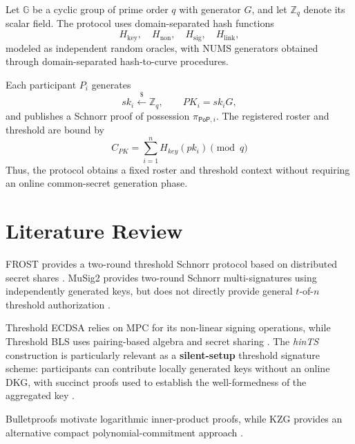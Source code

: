 \documentclass[10pt,a4paper]{article}
\newcommand{\Zq}{\mathbb{Z}_q}
\newcommand{\G}{\mathbb{G}}
\begin{document}
Let $\G$ be a cyclic group of prime order $q$ with generator $G$, and let
$\Zq$ denote its scalar field. The protocol uses domain-separated hash
functions
\[
H_{\mathrm{key}},\quad
H_{\mathrm{non}},\quad
H_{\mathrm{sig}},\quad
H_{\mathrm{link}},
\]
modeled as independent random oracles, with NUMS generators obtained through
domain-separated hash-to-curve procedures.

Each participant $P_i$ generates
\[
sk_i\xleftarrow{\$}\Zq,
\qquad
PK_i=sk_iG,
\]
and publishes a Schnorr proof of possession $\pi_{\mathsf{PoP},i}$. The
registered roster and threshold are bound by
$$C_{PK} = \sum_{i=1}^n H_{key}(pk_i) \pmod q$$
Thus, the protocol obtains a fixed roster and threshold context without
requiring an online common-secret generation phase.

\section{Literature Review}

FROST provides a two-round threshold Schnorr protocol based on distributed
secret shares \cite{FROST}. MuSig2 provides two-round Schnorr multi-signatures
using independently generated keys, but does not directly provide general
$t$-of-$n$ threshold authorization \cite{MuSig2}.

Threshold ECDSA relies on MPC for its non-linear signing operations, while
Threshold BLS uses pairing-based algebra and secret sharing
\cite{GennaroGoldfeder,ThBLS}. The \emph{hinTS} construction is particularly
relevant as a \textbf{silent-setup} threshold signature scheme: participants
can contribute locally generated keys without an online DKG, with succinct
proofs used to establish the well-formedness of the aggregated key
\cite{hinTS}.

Bulletproofs motivate logarithmic inner-product proofs, while KZG provides an
alternative compact polynomial-commitment approach
\cite{Bulletproofs,KZG}.
\end{document}
